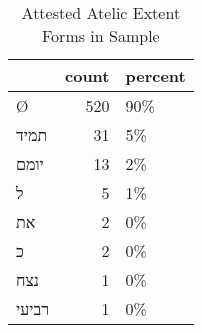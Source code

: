 \begin{table}[htbp!]
\centering
\caption{Attested Atelic Extent Forms in Sample}
\label{table:atel_front}
\begin{tabular}{lrl}
\toprule
{} &  count & percent \\
\midrule
\texthebrew{Ø}     &    520 &     90\% \\
\texthebrew{תמיד}  &     31 &      5\% \\
\texthebrew{יומם}  &     13 &      2\% \\
\texthebrew{ל}     &      5 &      1\% \\
\texthebrew{את}    &      2 &      0\% \\
\texthebrew{כ}     &      2 &      0\% \\
\texthebrew{נצח}   &      1 &      0\% \\
\texthebrew{רביעי} &      1 &      0\% \\
\bottomrule
\end{tabular}
\end{table}
